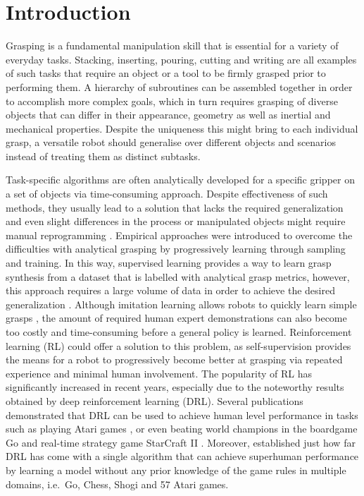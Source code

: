 \chapter{Introduction}

Grasping is a fundamental manipulation skill that is essential for a variety of everyday tasks. Stacking, inserting, pouring, cutting and writing are all examples of such tasks that require an object or a tool to be firmly grasped prior to performing them. A hierarchy of subroutines can be assembled together in order to accomplish more complex goals, which in turn requires grasping of diverse objects that can differ in their appearance, geometry as well as inertial and mechanical properties. Despite the uniqueness this might bring to each individual grasp, a versatile robot should generalise over different objects and scenarios instead of treating them as distinct subtasks.

Task-specific algorithms are often analytically developed for a specific gripper on a set of objects via time-consuming approach. Despite effectiveness of such methods, they usually lead to a solution that lacks the required generalization and even slight differences in the process or manipulated objects might require manual reprogramming \cite{sahbani_overview_2012}. Empirical approaches were introduced to overcome the difficulties with analytical grasping by progressively learning through sampling and training. In this way, supervised learning provides a way to learn grasp synthesis from a dataset that is labelled with analytical grasp metrics, however, this approach requires a large volume of data in order to achieve the desired generalization \cite{mahler_dex-net_2017}. Although imitation learning allows robots to quickly learn simple grasps \cite{zhang_deep_2018}, the amount of required human expert demonstrations can also become too costly and time-consuming before a general policy is learned. Reinforcement learning (RL) \cite{sutton_reinforcement_2018} could offer a solution to this problem, as self-supervision provides the means for a robot to progressively become better at grasping via repeated experience and minimal human involvement. The popularity of RL has significantly increased in recent years, especially due to the noteworthy results obtained by deep reinforcement learning (DRL). Several publications demonstrated that DRL can be used to achieve human level performance in tasks such as playing Atari games \cite{mnih_human-level_2015}, or even beating world champions in the boardgame Go \cite{silver_mastering_2017} and real-time strategy game StarCraft II \cite{vinyals_grandmaster_2019}. Moreover, \citet{schrittwieser_mastering_2020} established just how far DRL has come with a single algorithm that can achieve superhuman performance by learning a model without any prior knowledge of the game rules in multiple domains, i.e.~Go, Chess, Shogi and 57 Atari games.

